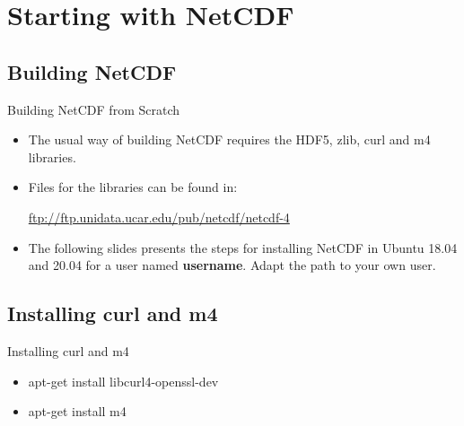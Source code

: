 \documentclass[compress,11pt,xcolor=svgnames,aspectratio=169]{beamer}
\begin{document}
\appendix

\begin{frame}[fragile]{}

{ \huge \color{EsiBlue}{ Appendix}}

\end{frame}

\section{Starting with NetCDF}
\label{ap:netcdf}

\subsection{Building NetCDF}

\begin{frame}[fragile]{Building NetCDF from Scratch}

\begin{itemize}
\setlength\itemsep{0.8cm}

  \item The usual way of building NetCDF requires the HDF5, zlib, curl and m4 libraries.

  \item Files for the libraries can be found in:

  \begin{center}
  \url{ftp://ftp.unidata.ucar.edu/pub/netcdf/netcdf-4}
  \end{center}

  \item The following slides presents the steps for installing NetCDF in Ubuntu 18.04 and 20.04 for a user named \textbf{username}. Adapt the path to your own user.

\end{itemize}

\end{frame}

\subsection{Installing curl and m4}

\begin{frame}[fragile]{Installing curl and m4}

\begin{itemize}
\setlength\itemsep{0.6cm}

  \item apt-get install libcurl4-openssl-dev
  \item apt-get install m4

\end{itemize}

\end{frame}
\end{document}
